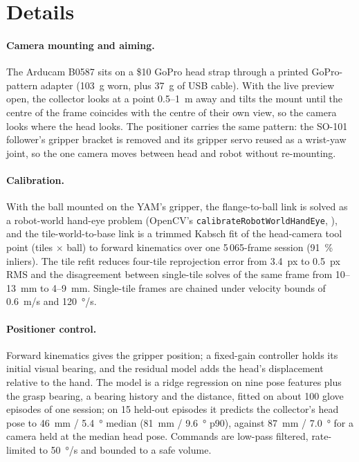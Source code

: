 \appendix
\setcounter{figure}{1}
\renewcommand{\thefigure}{A\arabic{figure}}
\setcounter{figure}{0}

\section{Details}
\label{app:details}

\paragraph{Camera mounting and aiming.}
The Arducam B0587 sits on a \$10 GoPro head strap through a printed GoPro-pattern adapter (\SI{103}{g} worn, plus \SI{37}{g} of USB cable). With the live preview open, the collector looks at a point \SI{0.5}{}--\SI{1}{m} away and tilts the mount until the centre of the frame coincides with the centre of their own view, so the camera looks where the head looks. The positioner carries the same pattern: the SO-101 follower's gripper bracket is removed and its gripper servo reused as a wrist-yaw joint, so the one camera moves between head and robot without re-mounting.

\paragraph{Calibration.}
With the ball mounted on the YAM's gripper, the flange-to-ball link is solved as a robot-world hand-eye problem (OpenCV's \texttt{calibrateRobotWorldHandEye}, \citet{shah2013robotworld}), and the tile-world-to-base link is a trimmed Kabsch fit of the head-camera tool point (tiles $\times$ ball) to forward kinematics over one 5\,065-frame session (\SI{91}{\percent} inliers). The tile refit reduces four-tile reprojection error from \SI{3.4}{px} to \SI{0.5}{px} RMS and the disagreement between single-tile solves of the same frame from \SI{10}{}--\SI{13}{mm} to \SI{4}{}--\SI{9}{mm}. Single-tile frames are chained under velocity bounds of \SI{0.6}{m/s} and \SI{120}{\degree/s}.

\paragraph{Positioner control.}
Forward kinematics gives the gripper position; a fixed-gain controller holds its initial visual bearing, and the residual model adds the head's displacement relative to the hand. The model is a ridge regression on nine pose features plus the grasp bearing, a bearing history and the distance, fitted on about 100 glove episodes of one session; on 15 held-out episodes it predicts the collector's head pose to \SI{46}{mm} / \SI{5.4}{\degree} median (\SI{81}{mm} / \SI{9.6}{\degree} p90), against \SI{87}{mm} / \SI{7.0}{\degree} for a camera held at the median head pose. Commands are low-pass filtered, rate-limited to \SI{50}{\degree/s} and bounded to a safe volume.

